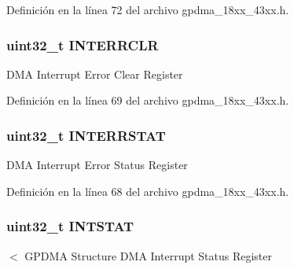 Definición en la línea 72 del archivo gpdma\+\_\+18xx\+\_\+43xx.\+h.

\subsubsection[{\texorpdfstring{I\+N\+T\+E\+R\+R\+C\+LR}{INTERRCLR}}]{ uint32\+\_\+t I\+N\+T\+E\+R\+R\+C\+LR}\hypertarget{struct_l_p_c___g_p_d_m_a___t_ade4abb628310cbd8a99c564c40293b9a}{}\label{struct_l_p_c___g_p_d_m_a___t_ade4abb628310cbd8a99c564c40293b9a}
D\+MA Interrupt Error Clear Register 

Definición en la línea 69 del archivo gpdma\+\_\+18xx\+\_\+43xx.\+h.

\subsubsection[{\texorpdfstring{I\+N\+T\+E\+R\+R\+S\+T\+AT}{INTERRSTAT}}]{ uint32\+\_\+t I\+N\+T\+E\+R\+R\+S\+T\+AT}\hypertarget{struct_l_p_c___g_p_d_m_a___t_a4c2fe03b9b6300d7eb967bcfde72dce5}{}\label{struct_l_p_c___g_p_d_m_a___t_a4c2fe03b9b6300d7eb967bcfde72dce5}
D\+MA Interrupt Error Status Register 

Definición en la línea 68 del archivo gpdma\+\_\+18xx\+\_\+43xx.\+h.

\subsubsection[{\texorpdfstring{I\+N\+T\+S\+T\+AT}{INTSTAT}}]{ uint32\+\_\+t I\+N\+T\+S\+T\+AT}\hypertarget{struct_l_p_c___g_p_d_m_a___t_a0bbac120700e7e8084acf696d17068ab}{}\label{struct_l_p_c___g_p_d_m_a___t_a0bbac120700e7e8084acf696d17068ab}
$<$ G\+P\+D\+MA Structure D\+MA Interrupt Status Register 

